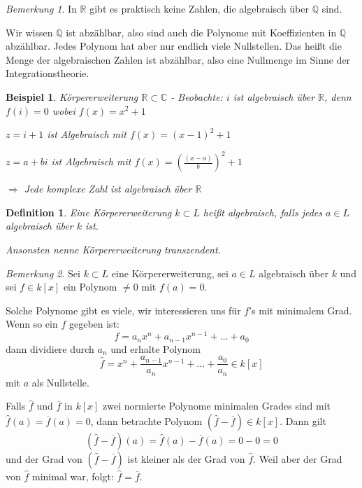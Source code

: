 \documentclass[a4paper,12pt,numbers=noenddot,parskip=full]{scrartcl}
\newcommand{\setQ}{\mathbb{Q}}
\newcommand{\setR}{\mathbb{R}}
\newcommand{\setC}{\mathbb{C}}
\theoremstyle{dotless}
\newtheorem{definition}[theorem]{Definition}
\newtheorem{example}[theorem]{Beispiel}
\theoremstyle{remark}
\newtheorem*{remark}{Bemerkung}
\begin{document}
	\begin{remark}
		In $\setR$ gibt es praktisch keine Zahlen, die algebraisch über $\setQ$ sind.
		
		Wir wissen $\setQ$ ist abzählbar, also sind auch die Polynome mit Koeffizienten in $\setQ$ abzählbar. Jedes Polynom hat aber nur endlich viele Nullstellen. Das heißt die Menge der algebraischen Zahlen ist abzählbar, also eine Nullmenge im Sinne der Integrationstheorie.
	\end{remark}

	\begin{example}
		Körpererweiterung $\setR \subset \setC$ - Beobachte: $i$ ist algebraisch über $\setR$, denn $f(i) = 0$ wobei $f(x) = x^2 + 1$
		
		$z = i + 1$ ist Algebraisch mit $f(x) = (x - 1)^2 + 1$
		
		$z = a + bi$ ist Algebraisch mit $f(x) = \left( \frac{(x - a)}{b} \right)^2 + 1$
		
		$\Rightarrow$ Jede komplexe Zahl ist algebraisch über $\setR$
	\end{example}

	\begin{definition}
		Eine Körpererweiterung $k \subset L$ heißt algebraisch, falls jedes $a \in L$ algebraisch über $k$ ist.
		
		Ansonsten nenne Körpererweiterung transzendent.
	\end{definition}

	\begin{remark}
		Sei $k \subset L$ eine Körpererweiterung, sei $a \in L$ algebraisch über $k$ und sei $f \in k[x]$ ein Polynom $\neq 0$ mit $f(a) = 0$.
		
		Solche Polynome gibt es viele, wir interessieren uns für $f$'s mit minimalem Grad. Wenn so ein $f$ gegeben ist:
		\begin{equation*}
			f = a_n x^n + a_{n-1} x^{n-1} + \dots + a_0
		\end{equation*}
		dann dividiere durch $a_n$ und erhalte Polynom
		\begin{equation*}
			\hat{f} = x^n + \frac{a_{n-1}}{a_n} x^{n-1} + \dots + \frac{a_0}{a_n} \in k[x]
		\end{equation*}
		mit $a$ als Nullstelle.
		
		Falls $\hat{f}$ und $\overline{f}$ in $k[x]$ zwei normierte Polynome minimalen Grades sind mit $\hat{f}(a) = \overline{f}(a) = 0$, dann betrachte Polynom $(\hat{f} - \overline{f}) \in k[x]$. Dann gilt
		\begin{equation*}
			(\hat{f} - \overline{f})(a) = \hat{f}(a) - \overline{f}(a) = 0 - 0 = 0
		\end{equation*}
		und der Grad von $(\hat{f} - \overline{f})$ ist kleiner als der Grad von $\hat{f}$. Weil aber der Grad von $\hat{f}$ minimal war, folgt: $\hat{f} = \overline{f}$.
	\end{remark}
\end{document}
